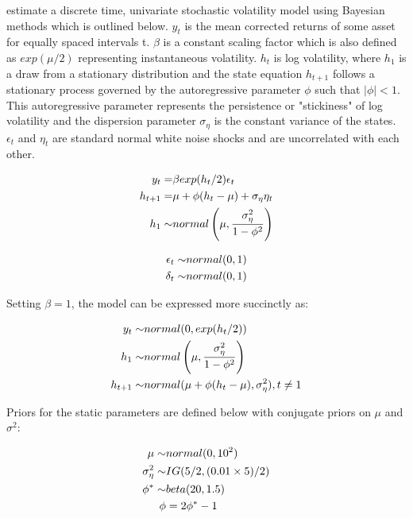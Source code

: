 \documentclass[12pt, a4paper]{article}
\begin{document}
    \citet{kim1998stochastic} estimate a discrete time, univariate stochastic volatility model using Bayesian methods which is outlined below. $y_t$ is the mean corrected returns of some asset for equally spaced intervals t. $\beta$ is a constant scaling factor which is also defined as $exp(\mu / 2)$ representing instantaneous volatility. $h_t$ is log volatility, where $h_1$ is a draw from a stationary distribution and the state equation $h_{t+1}$ follows a stationary process governed by the autoregressive parameter $\phi$ such that $|\phi|<1$. This autoregressive parameter represents the persistence or "stickiness" of log volatility and the dispersion parameter $\sigma_{\eta}$ is the constant variance of the states. $\epsilon_t$ and $\eta_t$ are standard normal white noise shocks and are uncorrelated with each other. 

    $$
    \begin{aligned}
    y_t =& \space \beta exp(h_t/2) \epsilon_t \\
    h_{t+1} =& \space \mu +\phi(h_t - \mu) + \sigma_{\eta} \eta_t  \\
    h_1 \sim& \space normal\left(\mu, \frac{\sigma_{\eta}^2}{1-\phi^2}\right) \\
    \end{aligned}
    $$


    $$
    \begin{aligned}
    \epsilon_t \sim& \space normal(0,1) \\
    \delta_t \sim& \space normal(0,1)
    \end{aligned}
    $$

    Setting $\beta=1$, the model can be expressed more succinctly as:

    $$
    \begin{aligned}
    y_t \sim& \space normal(0, exp(h_t/2)) \\ 
    h_1 \sim& \space normal \left(\mu, \frac{\sigma_{\eta}^2}{1-\phi^2}\right) \\
    h_{t+1} \sim& \space normal(\mu +\phi(h_t - \mu) , \sigma_{\eta}^2), \space\space t\neq 1\\ 
    \end{aligned}
    $$

    Priors for the static parameters are defined below with conjugate priors on $\mu$ and $\sigma^2$:

    $$
    \begin{aligned}
    \mu \sim& \space normal(0, 10^2) \\
    \sigma_{\eta}^2 \sim& \space IG(5/2, (0.01\times 5) / 2) \\
    \phi^{\ast} \sim& \space beta(20, 1.5) \\
    \phi &=  2\phi^{\ast} - 1
    \end{aligned}
    $$
\end{document}
